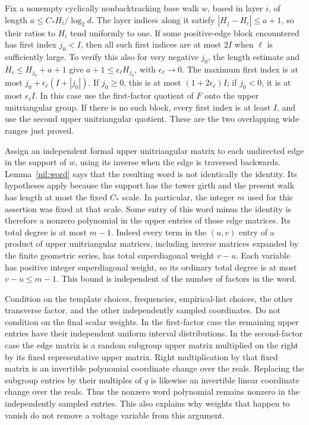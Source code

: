 Fix a nonempty cyclically nonbacktracking base walk \(w\), based in
layer \(i\), of length
\(a\le C_*H_i/\log_2d\).  The layer indices along it satisfy
\(|H_j-H_i|\le a+1\), so their ratios to \(H_i\) tend uniformly
to one.  If some positive-edge block encountered has first index
\(j_0<I\), then all such first indices are at most \(2I\) when
\(\ell\) is sufficiently large.  To verify this also for very
negative \(j_0\), the length estimate and
\(H_i\le H_{j_0}+a+1\) give
\(a+1\le\epsilon_\ell H_{j_0}\), with
\(\epsilon_\ell\to0\).  The maximum first index is at most
\(j_0+\epsilon_\ell(I+|j_0|)\).  If \(j_0\ge0\), this is
at most \((1+2\epsilon_\ell)I\); if \(j_0<0\), it is at most
\(\epsilon_\ell I\).  In this case use the first-factor quotient
of \(F\) onto the upper unitriangular group.  If there is no such
block, every first index is at least \(I\), and use the second
upper unitriangular quotient.  These are the two overlapping wide
ranges just proved.

Assign an independent formal upper unitriangular matrix to each
undirected edge in the support of \(w\), using its inverse when
the edge is traversed backwards.  Lemma~\ref{nil:word} says that
the resulting word is not identically the identity.  Its hypotheses
apply because the support has the tower girth and the present walk
has length at most the fixed \(C_*\) scale.  In particular, the
integer \(m\) used for this assertion was fixed at that scale.
Some entry of this word minus the identity is therefore a nonzero
polynomial in the upper entries of those edge matrices.  Its total
degree is at most \(m-1\).  Indeed every term in the \((u,v)\)
entry of a product of upper unitriangular matrices, including inverse
matrices expanded by the finite geometric series, has total
superdiagonal weight \(v-u\).  Each variable has positive integer
superdiagonal weight, so its ordinary total degree is at most
\(v-u\le m-1\).  This bound is independent of the number of
factors in the word.

Condition on the template choices, frequencies, empirical-list
choices, the other transverse factor, and the other independently
sampled coordinates.  Do not condition on the final scalar weights.
In the first-factor case the remaining upper entries have their
independent uniform interval distributions.  In the second-factor
case the edge matrix is a random subgroup upper matrix multiplied
on the right by its fixed representative upper matrix.  Right
multiplication by that fixed matrix is an invertible polynomial
coordinate change over the reals.  Replacing the subgroup entries
by their multiples of \(q\) is likewise an invertible linear
coordinate change over the reals.  Thus the nonzero word polynomial
remains nonzero in the independently sampled entries.  This also
explains why weights that happen to vanish do not remove a voltage
variable from this argument.

